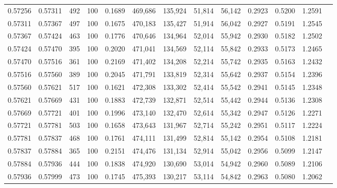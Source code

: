 \begin{tabular}{rrrrrrrrrrrrr}
0.57256 & 0.57311 &   492 & 100 &                                     0.1689 & 469,686 & 135,924 &  51,814 &  56,142 & 0.2923 & 0.5200 & 1.2591 \\
0.57311 & 0.57367 &   497 & 100 &                                     0.1675 & 470,183 & 135,427 &  51,914 &  56,042 & 0.2927 & 0.5191 & 1.2545 \\
0.57367 & 0.57424 &   463 & 100 &                                     0.1776 & 470,646 & 134,964 &  52,014 &  55,942 & 0.2930 & 0.5182 & 1.2502 \\
0.57424 & 0.57470 &   395 & 100 &                                     0.2020 & 471,041 & 134,569 &  52,114 &  55,842 & 0.2933 & 0.5173 & 1.2465 \\
0.57470 & 0.57516 &   361 & 100 &                                     0.2169 & 471,402 & 134,208 &  52,214 &  55,742 & 0.2935 & 0.5163 & 1.2432 \\
0.57516 & 0.57560 &   389 & 100 &                                     0.2045 & 471,791 & 133,819 &  52,314 &  55,642 & 0.2937 & 0.5154 & 1.2396 \\
0.57560 & 0.57621 &   517 & 100 &                                     0.1621 & 472,308 & 133,302 &  52,414 &  55,542 & 0.2941 & 0.5145 & 1.2348 \\
0.57621 & 0.57669 &   431 & 100 &                                     0.1883 & 472,739 & 132,871 &  52,514 &  55,442 & 0.2944 & 0.5136 & 1.2308 \\
0.57669 & 0.57721 &   401 & 100 &                                     0.1996 & 473,140 & 132,470 &  52,614 &  55,342 & 0.2947 & 0.5126 & 1.2271 \\
0.57721 & 0.57781 &   503 & 100 &                                     0.1658 & 473,643 & 131,967 &  52,714 &  55,242 & 0.2951 & 0.5117 & 1.2224 \\
0.57781 & 0.57837 &   468 & 100 &                                     0.1761 & 474,111 & 131,499 &  52,814 &  55,142 & 0.2954 & 0.5108 & 1.2181 \\
0.57837 & 0.57884 &   365 & 100 &                                     0.2151 & 474,476 & 131,134 &  52,914 &  55,042 & 0.2956 & 0.5099 & 1.2147 \\
0.57884 & 0.57936 &   444 & 100 &                                     0.1838 & 474,920 & 130,690 &  53,014 &  54,942 & 0.2960 & 0.5089 & 1.2106 \\
0.57936 & 0.57999 &   473 & 100 &                                     0.1745 & 475,393 & 130,217 &  53,114 &  54,842 & 0.2963 & 0.5080 & 1.2062 \\

\end{tabular}
